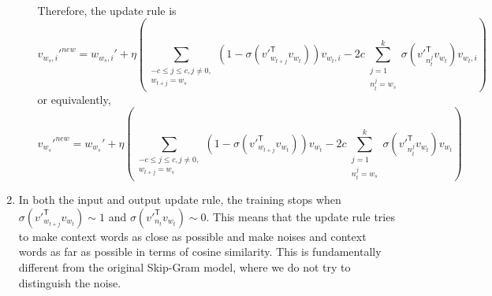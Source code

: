 \documentclass[
	12pt, %
]{../Template/fphw}
\newcommand{\T}{\mathsf{T}}
\begin{document}
\begin{enumerate}[label=(\arabic*)]
\begin{enumerate}[label=(\roman*)]
\begin{align}
            \end{align}
            Therefore, the update rule is
            \begin{equation}
                v_{w_s,i}'^{new} = w_{w_s,i}'+ \eta\left(\sum_{\substack{-c\leq j \leq c, j\neq 0, \\ w_{t+j}=w_s}}(1-\sigma(v'^\T_{w_{t+j}} v_{w_t})) v_{w_t,i}-2c\sum_{\substack{j=1\\n_t^j = w_s}}^k\sigma(v'^\T_{n_t^j} v_{w_t})v_{w_t,i} \right)
            \end{equation}
            or equivalently,
            \begin{equation}
                v_{w_s}'^{new} = w_{w_s}'+ \eta\left(\sum_{\substack{-c\leq j \leq c, j\neq 0, \\ w_{t+j}=w_s}}(1-\sigma(v'^\T_{w_{t+j}} v_{w_t})) v_{w_t}-2c\sum_{\substack{j=1\\n_t^j = w_s}}^k\sigma(v'^\T_{n_t^j} v_{w_t})v_{w_t} \right)
            \end{equation}
            \end{enumerate}
    \item In both the input and output update rule, the training stops when $\sigma(v'^\T_{w_{t+j}} v_{w_t}) \sim 1$ and $\sigma(v'^\T_{n_t} v_{w_t}) \sim 0$. This means that the update rule tries to make context words as close as possible and make noises and context words as far as possible in terms of cosine similarity. This is fundamentally different from the original Skip-Gram model, where we do not try to distinguish the noise.
    
\end{enumerate}
\end{document}
